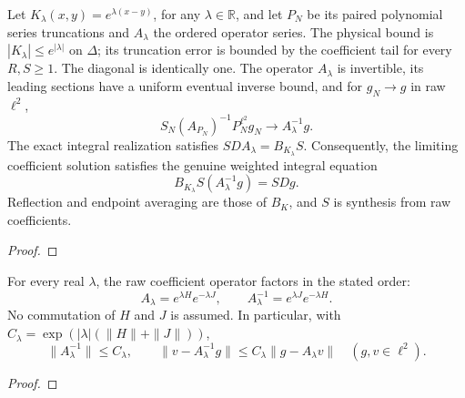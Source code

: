\begin{theorem}
\label{thm:volterra-exponential-solves}
\leanok
Let $K_\lambda(x,y)=e^{\lambda(x-y)}$, for any $\lambda\in\mathbb R$, and let
$P_N$ be its paired polynomial series truncations and $A_\lambda$ the ordered
operator series. The physical bound is $|K_\lambda|\le e^{|\lambda|}$ on
$\Delta$; its truncation error is bounded by the coefficient tail for every
$R,S\ge1$. The diagonal is identically one.
The operator $A_\lambda$ is invertible, its leading sections have a uniform
eventual inverse bound, and for $g_N\to g$ in raw $\ell^2$,
\[
 S_N(A_{P_N})^{-1}P_N^{\ell^2}g_N\to A_\lambda^{-1}g.
\]
The exact integral realization satisfies $SD A_\lambda=B_{K_\lambda}S$.
Consequently, the limiting coefficient solution satisfies the genuine weighted
integral equation
\[
 B_{K_\lambda}S(A_\lambda^{-1}g)=SDg.
\]
Reflection and endpoint averaging are those of $B_K$, and $S$ is synthesis from raw coefficients.
\end{theorem}
\begin{proof}
\leanok
\end{proof}


\begin{theorem}
\label{thm:volterra-exponential-factor}
\leanok
For every real $\lambda$, the raw coefficient operator factors in the stated order:
\[
 A_\lambda=e^{\lambda H}e^{-\lambda J},\qquad
 A_\lambda^{-1}=e^{\lambda J}e^{-\lambda H}.
\]
No commutation of $H$ and $J$ is assumed. In particular, with
$C_\lambda=\exp(|\lambda|(\|H\|+\|J\|))$,
\[
 \|A_\lambda^{-1}\|\le C_\lambda,\qquad
 \|v-A_\lambda^{-1}g\|\le C_\lambda\|g-A_\lambda v\|
 \quad(g,v\in\ell^2).
\]

\end{theorem}
\begin{proof}
\leanok
\end{proof}

